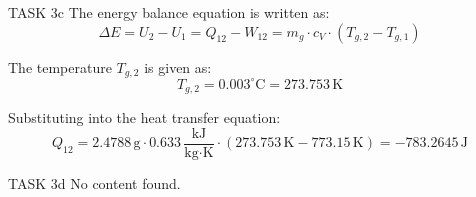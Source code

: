 TASK 3c  
The energy balance equation is written as:  
\[
\Delta E = U_2 - U_1 = Q_{12} - W_{12} = m_g \cdot c_V \cdot (T_{g,2} - T_{g,1})
\]  

The temperature \( T_{g,2} \) is given as:  
\[
T_{g,2} = 0.003^\circ\text{C} = 273.753 \, \text{K}
\]  

Substituting into the heat transfer equation:  
\[
Q_{12} = 2.4788 \, \text{g} \cdot 0.633 \, \frac{\text{kJ}}{\text{kg·K}} \cdot (273.753 \, \text{K} - 773.15 \, \text{K}) = -783.2645 \, \text{J}
\]  

TASK 3d  
No content found.